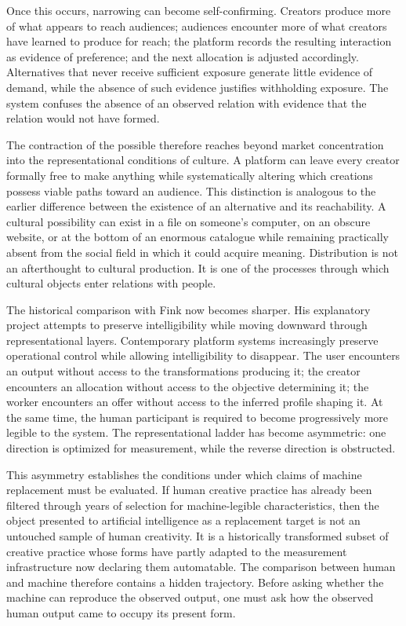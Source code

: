 \documentclass[11pt]{article}
\begin{document}
Once this occurs, narrowing can become self-confirming. Creators produce more of what appears to reach audiences; audiences encounter more of what creators have learned to produce for reach; the platform records the resulting interaction as evidence of preference; and the next allocation is adjusted accordingly. Alternatives that never receive sufficient exposure generate little evidence of demand, while the absence of such evidence justifies withholding exposure. The system confuses the absence of an observed relation with evidence that the relation would not have formed.

The contraction of the possible therefore reaches beyond market concentration into the representational conditions of culture. A platform can leave every creator formally free to make anything while systematically altering which creations possess viable paths toward an audience. This distinction is analogous to the earlier difference between the existence of an alternative and its reachability. A cultural possibility can exist in a file on someone's computer, on an obscure website, or at the bottom of an enormous catalogue while remaining practically absent from the social field in which it could acquire meaning. Distribution is not an afterthought to cultural production. It is one of the processes through which cultural objects enter relations with people.

The historical comparison with Fink now becomes sharper. His explanatory project attempts to preserve intelligibility while moving downward through representational layers. Contemporary platform systems increasingly preserve operational control while allowing intelligibility to disappear. The user encounters an output without access to the transformations producing it; the creator encounters an allocation without access to the objective determining it; the worker encounters an offer without access to the inferred profile shaping it. At the same time, the human participant is required to become progressively more legible to the system. The representational ladder has become asymmetric: one direction is optimized for measurement, while the reverse direction is obstructed.

This asymmetry establishes the conditions under which claims of machine replacement must be evaluated. If human creative practice has already been filtered through years of selection for machine-legible characteristics, then the object presented to artificial intelligence as a replacement target is not an untouched sample of human creativity. It is a historically transformed subset of creative practice whose forms have partly adapted to the measurement infrastructure now declaring them automatable. The comparison between human and machine therefore contains a hidden trajectory. Before asking whether the machine can reproduce the observed output, one must ask how the observed human output came to occupy its present form.
\end{document}
